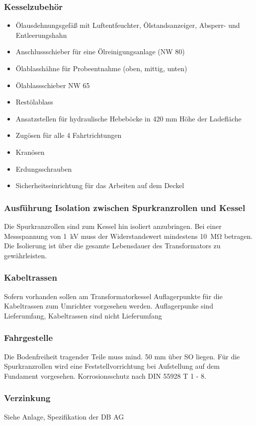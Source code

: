 \subsubsection*{Kesselzubehör}
\begin{itemize}[noitemsep]
    \item Ölausdehnungsgefäß mit Luftentfeuchter, Ölstandsanzeiger, Absperr- und Entleerungshahn
    \item Anschlussschieber für eine Ölreinigungsanlage (NW 80)
    \item Ölablasshähne für Probeentnahme (oben, mittig, unten)
    \item Ölablassschieber NW 65
    \item Restölablass
    \item Ansatzstellen für hydraulische Hebeböcke in 420 mm Höhe der Ladefläche
    \item Zugösen für alle 4 Fahrtrichtungen
    \item Kranösen
    \item Erdungsschrauben
    \item Sicherheitseinrichtung für das Arbeiten auf dem Deckel
\end{itemize}
\subsubsection*{Ausführung Isolation zwischen Spurkranzrollen  und Kessel}
Die Spurkranzrollen sind zum Kessel hin isoliert anzubringen.
 Bei einer Messspannung von \SI[]{1}[]{\kV} muss der Widerstandswert mindestens \SI[]{10}[]{\mega\ohm} betragen.
 Die Isolierung ist über die gesamte Lebensdauer des Transformators zu gewährleisten. 
\subsubsection*{Kabeltrassen}
Sofern vorhanden sollen am Transformatorkessel Auflagerpunkte für die Kabeltrassen zum Umrichter vorgesehen werden. Auflagerpunke sind Lieferumfang, Kabeltrassen sind nicht Lieferumfang

\subsubsection*{Fahrgestelle}
Die Bodenfreiheit tragender Teile muss mind. 50 mm über SO liegen. Für die Spurkranzrollen wird eine Feststellvorrichtung bei Aufstellung auf dem Fundament vorgesehen. Korrosionsschutz nach DIN 55928 T 1 - 8.

\subsubsection*{Verzinkung}
Siehe Anlage, Spezifikation der DB AG

